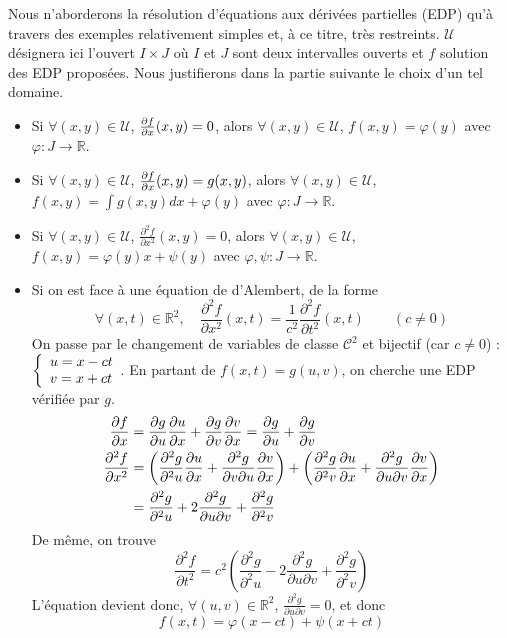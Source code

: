     Nous n’aborderons la résolution d’équations aux dérivées partielles (EDP) qu’à travers des exemples relativement simples et, à ce titre, très restreints. $\mathcal{U}$ désignera ici l’ouvert $I \times J$ où $I$ et $J$ sont deux intervalles ouverts et $f$ solution des EDP proposées. Nous justifierons dans la partie suivante le choix d’un tel domaine.
    \begin{itemize}
        \item Si $\forall (x,y) \in \mathcal{U}$, $\frac{\partial f}{\partial x}(x,y) = 0$, alors $\forall (x,y) \in \mathcal{U}$,  $f(x,y) = \varphi(y)$ avec $\varphi : J \to \mathbb{R}$. 
        \item Si $\forall (x,y) \in \mathcal{U}$, $\frac{\partial f}{\partial x}(x,y) = g(x,y)$, alors $\forall (x,y) \in \mathcal{U}$,  $f(x,y) = \int g(x,y) dx +  \varphi(y)$ avec $\varphi : J \to \mathbb{R}$.
        \item Si $\forall (x,y) \in \mathcal{U}$, $\frac{\partial^2 f}{\partial x^2}(x,y) = 0$, alors $\forall (x,y) \in \mathcal{U}$,  $f(x,y) = \varphi(y)x + \psi(y)$ avec $\varphi, \psi : J \to \mathbb{R}$.
        \item Si on est face à une équation de d’Alembert, de la forme 
        \[ \forall (x,t) \in \mathbb{R}^2, \quad \frac{\partial^2 f}{\partial x^2} (x,t) = \frac{1}{c^2} \frac{\partial^2 f}{\partial t^2}(x,t) \qquad (c \neq 0) \]   
        On passe par le changement de variables de classe $\mathcal{C}^2$ et bijectif (car $c \neq 0$) :  $\et{u = x-ct}{v = x + ct}$. En partant de $f(x,t) = g(u,v)$, on cherche une EDP vérifiée par $g$.
        \begin{align*}
            \frac{\partial f}{\partial x} &= \frac{\partial g}{\partial u} \frac{\partial u}{\partial x} + \frac{\partial g}{\partial v} \frac{\partial v}{\partial x} = \frac{\partial g}{\partial u} + \frac{\partial g}{\partial v} \\
            \frac{\partial^2 f}{\partial x^2} &= \left(\frac{\partial^2 g}{\partial^2 u} \frac{\partial u}{\partial x} + \frac{\partial^2 g}{\partial v \partial u} \frac{\partial v}{\partial x}\right) + \left(\frac{\partial^2 g}{\partial^2 v} \frac{\partial u}{\partial x} + \frac{\partial^2 g}{\partial u \partial v} \frac{\partial v}{\partial x}\right) \\
            &= \frac{\partial^2 g}{\partial^2 u} + 2 \frac{\partial^2 g}{\partial u \partial v} + \frac{\partial^2 g}{\partial^2 v}
        \end{align*}
        De même, on trouve 
        \[ \frac{\partial^2 f}{\partial t^2} = c^2 \left(\frac{\partial^2 g}{\partial^2 u} - 2 \frac{\partial^2 g}{\partial u \partial v} + \frac{\partial^2 g}{\partial^2 v}\right) \]   
        L’équation devient donc, $\forall (u,v) \in \mathbb{R}^2$, 
        $\frac{\partial^2 g}{\partial u \partial v} = 0$, et donc 
        \[ f(x,t) = \varphi(x-ct) + \psi(x + ct) \]   
        
    \end{itemize}

